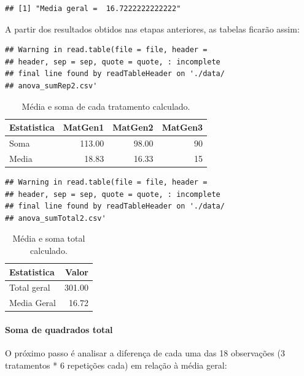 \documentclass[
]{article}
\begin{document}
\begin{verbatim}
## [1] "Media geral =  16.7222222222222"
\end{verbatim}

A partir dos resultados obtidos nas etapas anteriores, as tabelas ficarão assim:

\begin{verbatim}
## Warning in read.table(file = file, header =
## header, sep = sep, quote = quote, : incomplete
## final line found by readTableHeader on './data/
## anova_sumRep2.csv'
\end{verbatim}

\begin{table}

\caption{\label{tab:unnamed-chunk-13}Média e soma de cada tratamento calculado.}
\centering
\begin{tabular}[t]{l|r|r|r}
\hline
Estatistica & MatGen1 & MatGen2 & MatGen3\\
\hline
Soma & 113.00 & 98.00 & 90\\
\hline
Media & 18.83 & 16.33 & 15\\
\hline
\end{tabular}
\end{table}

\begin{verbatim}
## Warning in read.table(file = file, header =
## header, sep = sep, quote = quote, : incomplete
## final line found by readTableHeader on './data/
## anova_sumTotal2.csv'
\end{verbatim}

\begin{table}

\caption{\label{tab:unnamed-chunk-14}Média e soma total calculado.}
\centering
\begin{tabular}[t]{l|r}
\hline
Estatistica & Valor\\
\hline
Total geral & 301.00\\
\hline
Media Geral & 16.72\\
\hline
\end{tabular}
\end{table}

\hypertarget{soma-de-quadrados-total}{%
\paragraph{Soma de quadrados total}\label{soma-de-quadrados-total}}

O próximo passo é analisar a diferença de cada uma das 18 observações (3 tratamentos * 6 repetições cada) em relação à média geral:
\end{document}
